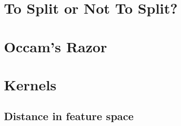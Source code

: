 \documentclass[12pt]{article}
\begin{document}
\section{To Split or Not To Split?}



\section{Occam's Razor}



\section{Kernels}

\subsection{Distance in feature space}


\end{document}
